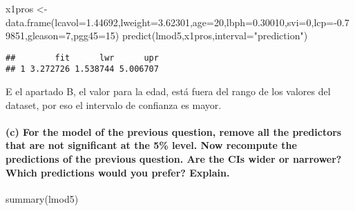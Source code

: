 \documentclass[
]{article}
\newenvironment{Shaded}{\begin{snugshade}}{\end{snugshade}}
\newcommand{\AttributeTok}[1]{\textcolor[rgb]{0.77,0.63,0.00}{#1}}
\newcommand{\DecValTok}[1]{\textcolor[rgb]{0.00,0.00,0.81}{#1}}
\newcommand{\FloatTok}[1]{\textcolor[rgb]{0.00,0.00,0.81}{#1}}
\newcommand{\FunctionTok}[1]{\textcolor[rgb]{0.00,0.00,0.00}{#1}}
\newcommand{\NormalTok}[1]{#1}
\newcommand{\OtherTok}[1]{\textcolor[rgb]{0.56,0.35,0.01}{#1}}
\newcommand{\SpecialCharTok}[1]{\textcolor[rgb]{0.00,0.00,0.00}{#1}}
\newcommand{\StringTok}[1]{\textcolor[rgb]{0.31,0.60,0.02}{#1}}
\begin{document}
\begin{Shaded}
\begin{Highlighting}[]
\NormalTok{x1pros }\OtherTok{\textless{}{-}} \FunctionTok{data.frame}\NormalTok{(}\AttributeTok{lcavol=}\FloatTok{1.44692}\NormalTok{,}\AttributeTok{lweight=}\FloatTok{3.62301}\NormalTok{,}\AttributeTok{age=}\DecValTok{20}\NormalTok{,}\AttributeTok{lbph=}\FloatTok{0.30010}\NormalTok{,}\AttributeTok{svi=}\DecValTok{0}\NormalTok{,}\AttributeTok{lcp=}\SpecialCharTok{{-}}\FloatTok{0.79851}\NormalTok{,}\AttributeTok{gleason=}\DecValTok{7}\NormalTok{,}\AttributeTok{pgg45=}\DecValTok{15}\NormalTok{)}
\FunctionTok{predict}\NormalTok{(lmod5,x1pros,}\AttributeTok{interval=}\StringTok{"prediction"}\NormalTok{)}
\end{Highlighting}
\end{Shaded}

\begin{verbatim}
##        fit      lwr      upr
## 1 3.272726 1.538744 5.006707
\end{verbatim}

E el apartado B, el valor para la edad, está fuera del rango de los
valores del dataset, por eso el intervalo de confianza es mayor.

\hypertarget{c-for-the-model-of-the-previous-question-remove-all-the-predictors-that-are-not-significant-at-the-5-level.-now-recompute-the-predictions-of-the-previous-question.-are-the-cis-wider-or-narrower-which-predictions-would-you-prefer-explain.}{%
\paragraph{(c) For the model of the previous question, remove all the
predictors that are not significant at the 5\% level. Now recompute the
predictions of the previous question. Are the CIs wider or narrower?
Which predictions would you prefer?
Explain.}\label{c-for-the-model-of-the-previous-question-remove-all-the-predictors-that-are-not-significant-at-the-5-level.-now-recompute-the-predictions-of-the-previous-question.-are-the-cis-wider-or-narrower-which-predictions-would-you-prefer-explain.}}

\begin{Shaded}
\begin{Highlighting}[]
 \FunctionTok{summary}\NormalTok{(lmod5)}
\end{Highlighting}
\end{Shaded}
\end{document}
